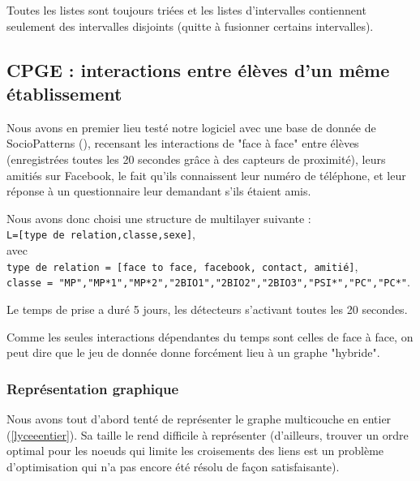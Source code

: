 \documentclass[11pt,a4paper]{article}
\theoremstyle{definition}
\theoremstyle{remark}
\theoremstyle{remark}
\begin{document}
	Toutes les listes sont toujours triées et les listes d'intervalles contiennent seulement des intervalles disjoints (quitte à fusionner certains intervalles).
	
	

\subsection{CPGE : interactions entre élèves d'un même établissement}

Nous avons en premier lieu testé notre logiciel avec une base de donnée de SocioPatterns (\cite{cpge}), recensant les interactions de "face à face" entre élèves (enregistrées toutes les 20 secondes grâce à des capteurs de proximité), leurs amitiés sur Facebook, le fait qu'ils connaissent leur numéro de téléphone, et leur réponse à un questionnaire leur demandant s'ils étaient amis.

Nous avons donc choisi une structure de multilayer suivante : \\
{\tt L=[type de relation,classe,sexe]},\\
 avec\\
  {\tt type de relation = [face to face, facebook, contact, amitié]},\\
  {\tt classe = "MP","MP*1","MP*2","2BIO1","2BIO2","2BIO3","PSI*","PC","PC*"}.
  
  Le temps de prise a duré 5 jours, les détecteurs s'activant toutes les 20 secondes.
  
  Comme les seules interactions dépendantes du temps sont celles de face à face, on peut dire que le jeu de donnée donne forcément lieu à un graphe "hybride".
  
	\subsubsection{Représentation graphique}  
  
  Nous avons tout d'abord tenté de représenter le graphe multicouche en entier (\cref{lyceeentier}). Sa taille le rend difficile à représenter (d'ailleurs, trouver un ordre optimal pour les noeuds qui limite les croisements des liens est un problème d'optimisation qui n'a pas encore été résolu de façon satisfaisante).
	
\end{document}
